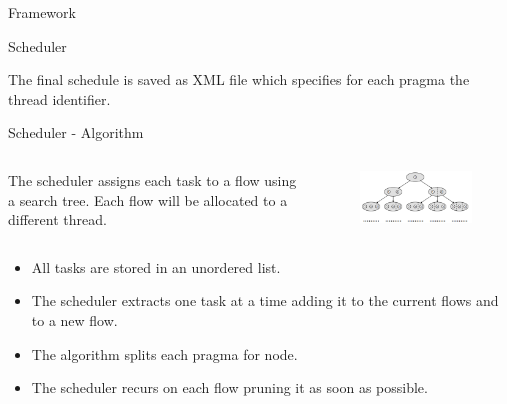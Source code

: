 \documentclass[xcolor=dvipsnames]{beamer}
\begin{document}
\begin{section}{Framework}
\begin{frame}{\hskip 0.3cm Scheduler }
\begin{itemize}
\end{itemize}

The final schedule is saved as XML file which specifies for each pragma the thread identifier.

\end{frame}







\begin{frame}{\hskip 0.3cm Scheduler - Algorithm}
\vskip -0.9cm
\begin{columns}

\begin{column}{6cm}

The scheduler assigns each task to a flow using a search tree. Each flow will be allocated to a different thread.

\end{column}

\begin{column}{4.5cm}

\begin{figure}
\centering
\includegraphics[scale=0.37]{search_tree.png}
\end{figure}
\end{column}


\end{columns}

\begin{itemize}

\item All tasks are stored in an unordered list.

\item The scheduler extracts one task at a time adding it to the current flows and to a new flow.

\item The algorithm splits each pragma for node.

\item The scheduler recurs on each flow pruning it as soon as possible.


\end{itemize}
\end{frame}
\end{section}
\end{document}

